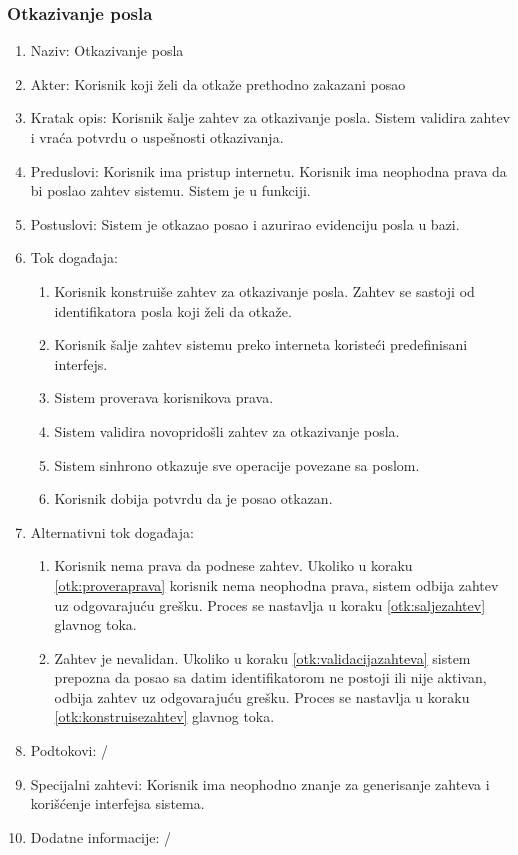 \documentclass[12pt,oneside]{memoir}
\begin{document}
\subsubsection{Otkazivanje posla}
\begin{enumerate}
\item Naziv: Otkazivanje posla
\item Akter: Korisnik koji želi da otkaže prethodno zakazani posao
\item Kratak opis: Korisnik šalje zahtev za otkazivanje posla. Sistem validira zahtev i vraća potvrdu o uspešnosti otkazivanja.
\item Preduslovi: Korisnik ima pristup internetu. Korisnik ima neophodna prava da bi poslao zahtev sistemu. Sistem je u funkciji.
\item Postuslovi: Sistem je otkazao posao i azurirao evidenciju posla u bazi.
\item Tok događaja:
	\begin{enumerate}
	\item \label{otk:konstruisezahtev} Korisnik konstruiše zahtev za otkazivanje posla. Zahtev se sastoji od identifikatora posla koji želi da otkaže.
	\item \label{otk:saljezahtev} Korisnik šalje zahtev sistemu preko interneta koristeći predefinisani interfejs.
	\item \label{otk:proveraprava} Sistem proverava korisnikova prava.
	\item \label{otk:validacijazahteva} Sistem validira novopridošli zahtev za otkazivanje posla.
	\item \label{otk:sinhotkazivanje} Sistem sinhrono otkazuje sve operacije povezane sa poslom.
	\item Korisnik dobija potvrdu da je posao otkazan.
	\end{enumerate}
\item Alternativni tok događaja:
	\begin{enumerate}
	\item Korisnik nema prava da podnese zahtev. Ukoliko u koraku \ref{otk:proveraprava} korisnik nema neophodna prava, sistem odbija zahtev uz odgovarajuću grešku. Proces se nastavlja u koraku \ref{otk:saljezahtev} glavnog toka.
	\item Zahtev je nevalidan. Ukoliko u koraku \ref{otk:validacijazahteva} sistem prepozna da posao sa datim identifikatorom ne postoji ili nije aktivan, odbija zahtev uz odgovarajuću grešku. Proces se nastavlja u koraku \ref{otk:konstruisezahtev} glavnog toka.
	\end{enumerate}
\item Podtokovi: /
\item Specijalni zahtevi: Korisnik ima neophodno znanje za generisanje zahteva i korišćenje interfejsa sistema.
\item Dodatne informacije: /
\end{enumerate}
\end{document}
